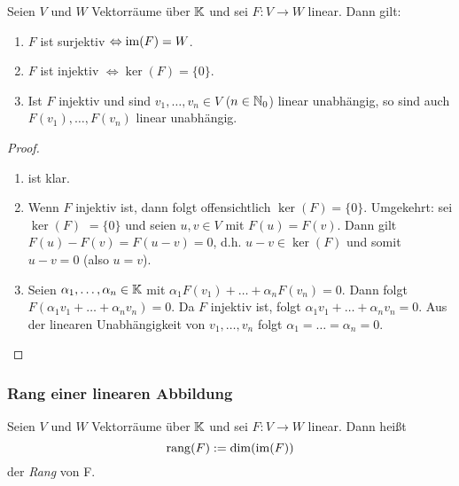 \begin{propn}
	Seien $ V $ und $ W $ Vektorräume über $ \mathbb K $ und sei $ F : V \to W $ linear. Dann gilt:
	\begin{enumerate}[label=\normalfont(\alph*)]
		\item $ F $ ist surjektiv $ \Leftrightarrow \operatorname{im}(F) = W $.
		\item $ F $ ist injektiv $ \Leftrightarrow \ker(F) = \{ 0 \} $.
		\item Ist $ F $ injektiv und sind $ v_1,\ldots,v_n \in V $ ($ n\in\mathbb N_0 $) linear unabhängig, so sind auch $ F(v_1),\ldots,F(v_n) $ linear unabhängig.
	\end{enumerate}
\end{propn}
\begin{proof}
\begin{enumerate}[label=\normalfont(\alph*)]
	\item
		ist klar.
	\item
		Wenn $ F $ injektiv ist, dann folgt offensichtlich $ \ker(F) = \{0\} $. Umgekehrt: sei $ \ker(F) $ $ = \{ 0 \} $ und seien $ u,v \in V $ mit $ F(u) = F(v) $. Dann gilt $ F(u) - F(v) = F(u-v) = 0 $, d.h. $ u-v \in \ker(F) $ und somit $ u-v = 0 $ (also $ u = v $).
	\item
		Seien $ \alpha_1,\ldots,\alpha_n\in\mathbb K $ mit $ \alpha_1F(v_1) + \ldots + \alpha_nF(v_n) = 0 $. Dann folgt $ F(\alpha_1v_1 + \ldots + \alpha_nv_n) = 0 $. Da $ F $ injektiv ist, folgt $ \alpha_1v_1 + \ldots + \alpha_nv_n = 0 $. Aus der linearen Unabhängigkeit von $ v_1,\ldots,v_n $ folgt $ \alpha_1 = \ldots = \alpha_n = 0 $. \qedhere
\end{enumerate}
\end{proof}

\subsubsection{Rang einer linearen Abbildung}

Seien $ V $ und $ W $ Vektorräume über $ \mathbb K $ und sei $ F : V \to W $ linear. Dann heißt
\begin{equation}
	\operatorname{rang}(F) := \dim(\operatorname{im}(F))
\end{equation}
der \emph{Rang} von F.

